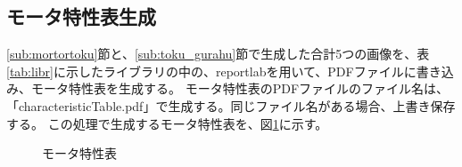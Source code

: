\subsection{モータ特性表生成}\label{sub:}
\ref{sub:mortortoku}節と、\ref{sub:toku_gurahu}節で生成した合計5つの画像を、表\ref{tab:libr}に示したライブラリの中の、reportlabを用いて、PDFファイルに書き込み、モータ特性表を生成する。
モータ特性表のPDFファイルのファイル名は、「characteristicTable.pdf」で生成する。同じファイル名がある場合、上書き保存する。
この処理で生成するモータ特性表を、図\ref{fig:tokuseihyou}に示す。
\begin{figure}[t]
	\centering
	\caption{モータ特性表}
	\label{fig:tokuseihyou}
\end{figure}